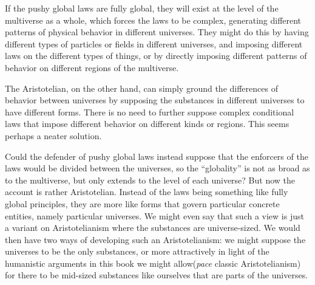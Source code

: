 If the pushy global laws are fully global, they will exist at the level of the multiverse as a whole, which forces the
laws to be complex, generating different patterns of physical behavior in different universes. They might do this
by having different types of particles or fields in different universes, and imposing different laws on the 
different types of things, or by directly imposing different patterns of behavior on different regions of the multiverse.

The Aristotelian, on the other hand, can simply ground the differences of behavior between universes by supposing 
the substances in different universes to have different forms. There is no need to further suppose complex conditional 
laws that impose different behavior on different kinds or regions. This seems perhaps a neater solution.

Could the defender of pushy global laws instead suppose that the enforcers of the laws would be divided between the 
universes, so the ``globality'' is not as broad as to the multiverse, but only extends to the level of each universe?
But now the account is rather Aristotelian. Instead of the laws being something like fully global principles, they are 
more like forms that govern particular concrete entities, namely particular universes. We might even say that such a 
view is just a variant on Aristotelianism where the substances are universe-sized. We would then have two ways of 
developing such an Aristotelianism: we might suppose the universes to be the only substances, or more attractively 
in light of the humanistic arguments in this book we might allow(\textit{pace} classic Aristotelianism) for there to 
be mid-sized substances like ourselves that are parts of the universes. 


\chaptertail
